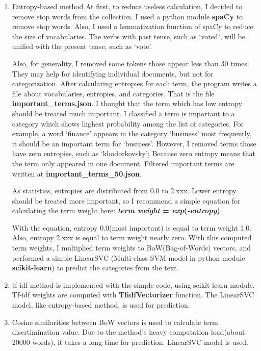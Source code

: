\documentclass{article}
\begin{document}
\begin{enumerate}
  \item Entropy-based method
  At first, to reduce useless calculation,
  I decided to remove stop words from the collection.
  I used a python module \textbf{spaCy} to remove stop words.
  Also, I used a lemmatization function of spaCy to reduce the size of
  vocabularies. The verbs with past tense, such as `voted', will be unified
  with the present tense, such as `vote'.

  Also, for generality, I removed some tokens those appear less than 30 times.
  They may help for identifying individual documents, but not for categorization.
  After calculating entropies for each term, the program writes a file about
  vocabularies, entropies, and categories.
  That is the file \textbf{important\_terms.json}.
  I thought that the term which has low entropy should be treated much important.
  I classified a term is important to a category
  which shows highest probability among the list of categories.
  For example, a word `finance' appears in the category `business' most frequently,
  it should be an important term for `business'.
  However, I removed terms those have zero entropies, such as `khodorkovsky';
  Because zero entropy means that the term only appeared in one document.
  Filtered important terms are written at \textbf{important\_terms\_50.json}.

  As statistics, entropies are distributed from 0.0 to 2.xxx.
  Lower entropy should be treated more important,
  so I recommend a simple equation for calculating the term weight here:
  \textbf{\textit{term weight} = \textit{exp}(\textit{-entropy})}.

  With the equation, entropy 0.0(most important) is equal to term weight 1.0.
  Also, entropy 2.xxx is equal to term weight nearly zero.
  With this computed term weights,
  I multiplied term weights to BoW(Bag-of-Words) vectors,
  and performed a simple LinearSVC
  (Multi-class SVM model in python module \textbf{scikit-learn}) to predict the categories from the text.
  
  \item tf-idf method is implemented with the simple code,
  using scikit-learn module.
  Tf-idf weights are computed with \textbf{TfidfVectorizer} function.
  The LinearSVC model, like entropy-based method, is used for prediction.

  \item Cosine similarities between BoW vectors is used to
  calculate term discrtimination value.
  Due to the method's heavy computation load(about 20000 words), it takes a long time for prediction.
  LinearSVC model is used.
\end{enumerate}
\end{document}
